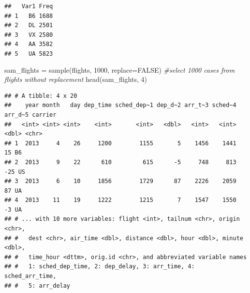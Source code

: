 \documentclass[
]{article}
\newenvironment{Shaded}{\begin{snugshade}}{\end{snugshade}}
\newcommand{\AttributeTok}[1]{\textcolor[rgb]{0.77,0.63,0.00}{#1}}
\newcommand{\CommentTok}[1]{\textcolor[rgb]{0.56,0.35,0.01}{\textit{#1}}}
\newcommand{\ConstantTok}[1]{\textcolor[rgb]{0.00,0.00,0.00}{#1}}
\newcommand{\DecValTok}[1]{\textcolor[rgb]{0.00,0.00,0.81}{#1}}
\newcommand{\FunctionTok}[1]{\textcolor[rgb]{0.00,0.00,0.00}{#1}}
\newcommand{\NormalTok}[1]{#1}
\newcommand{\OtherTok}[1]{\textcolor[rgb]{0.56,0.35,0.01}{#1}}
\newcommand{\SpecialCharTok}[1]{\textcolor[rgb]{0.00,0.00,0.00}{#1}}
\begin{document}
\begin{Shaded}
\end{Shaded}

\begin{verbatim}
##   Var1 Freq
## 1   B6 1688
## 2   DL 2501
## 3   VX 2580
## 4   AA 3582
## 5   UA 5823
\end{verbatim}

\begin{Shaded}
\begin{Highlighting}[]
\NormalTok{sam\_flights }\OtherTok{=} \FunctionTok{sample}\NormalTok{(flights, }\DecValTok{1000}\NormalTok{, }\AttributeTok{replace=}\ConstantTok{FALSE}\NormalTok{)  }\CommentTok{\#select 1000 cases from flights without replacement}
\FunctionTok{head}\NormalTok{(sam\_flights, }\DecValTok{4}\NormalTok{) }
\end{Highlighting}
\end{Shaded}

\begin{verbatim}
## # A tibble: 4 x 20
##    year month   day dep_time sched_dep~1 dep_d~2 arr_t~3 sched~4 arr_d~5 carrier
##   <int> <int> <int>    <int>       <int>   <dbl>   <int>   <int>   <dbl> <chr>  
## 1  2013     4    26     1200        1155       5    1456    1441      15 B6     
## 2  2013     9    22      610         615      -5     748     813     -25 US     
## 3  2013     6    10     1856        1729      87    2226    2059      87 UA     
## 4  2013    11    19     1222        1215       7    1547    1550      -3 UA     
## # ... with 10 more variables: flight <int>, tailnum <chr>, origin <chr>,
## #   dest <chr>, air_time <dbl>, distance <dbl>, hour <dbl>, minute <dbl>,
## #   time_hour <dttm>, orig.id <chr>, and abbreviated variable names
## #   1: sched_dep_time, 2: dep_delay, 3: arr_time, 4: sched_arr_time,
## #   5: arr_delay
\end{verbatim}

\begin{Shaded}
\end{Shaded}
\end{document}
